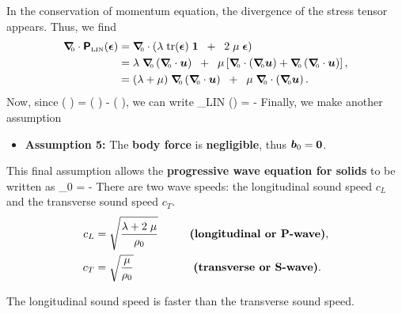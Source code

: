 In the conservation of momentum equation, the divergence of the stress tensor appears.
Thus, we find
\begin{align}
\Grad \cdot \tPbold_{\mbox{\tiny{LIN}}} (\ve{\epsilon})
&= \Grad \cdot \left(
\lambda \; \trace(\ve{\epsilon}) \; \vid \;\;+\;\; 2 \; \mu \; \ve{\epsilon}
\right) \\
&= \lambda \; \Grad \left(\Grad \cdot \vu \right) \;\;+\;\; 
\mu \left[ 
 \Grad \cdot \left(\Grad \vu \right) + \Grad \left(\Grad \cdot \vu \right)
\right], \\
&= (\lambda + \mu) \; \Grad \left(\Grad \cdot \vu \right) \;\;+\;\; \mu \; \Grad \cdot \left(\Grad \vu \right).
\end{align}
Now, since
\be
\Grad \cdot \left( \Grad \vu \right) = \Grad \left( \Grad \cdot \vu \right) - 
\left( \Grad \times \Grad \times \vu \right),
\ee
we can write
\be
\Grad \cdot \tPbold_{\mbox{\tiny{LIN}}} (\ve{\epsilon})
 = 
 \;\;-\;\; 
\ee
Finally, we make another assumption
\begin{itemize}
\item {\bf Assumption 5:} The {\bf body force} is 
{\bf negligible}, thus $\mbox{\boldmath $b$}_0 = \mbox{\boldmath $0$}$.
\end{itemize}
This final assumption allows the {\bf progressive wave equation for solids} to be 
written as
\be
 \rho_0 \; \ddot{\vu}  
 = 
 \;\;-\;\; 
\ee
There are two wave speeds: the longitudinal sound speed $c_L$ and the transverse
sound speed $c_T$.  
\begin{align}
 c_L &= \sqrt{\displaystyle\frac{\lambda + 2 \; \mu}{\rho_0}} \hspace{1.0cm} \mbox{\bf (longitudinal
 or P-wave)}, \\
 c_T &= \sqrt{\displaystyle\frac{\mu}{\rho_0}} \hspace{1.9cm} \mbox{\bf (transverse or S-wave)}.
\end{align}
\begin{Hremark}
The longitudinal sound speed is faster than the transverse sound speed.
\end{Hremark}

